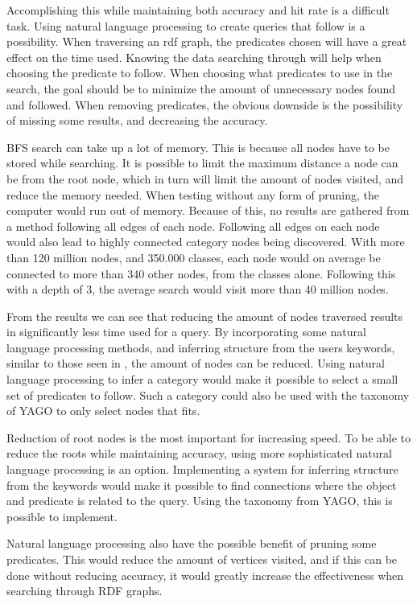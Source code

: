 Accomplishing this while maintaining both accuracy and hit rate is a difficult task. 
Using natural language processing to create queries that follow is a possibility.
When traversing an rdf graph, the predicates chosen will have a great effect on the time used. 
Knowing the data searching through will help when choosing the predicate to follow. 
When choosing what predicates to use in the search, the goal should be to minimize the amount of unnecessary nodes found and followed. 
When removing predicates, the obvious downside is the possibility of missing some results, and decreasing the accuracy.

BFS search can take up a lot of memory. This is because all nodes have to be stored while searching. It is possible to limit the maximum distance a node can be from the root node, which in turn will limit the amount of nodes visited, and reduce the memory needed. When testing without any form of pruning, the computer would run out of memory. Because of this, no results are gathered from a method following all edges of each node. Following all edges on each node would also lead to highly connected category nodes being discovered. With more than 120 million nodes, and 350.000 classes, each node would on average be connected to more than 340 other nodes, from the classes alone. Following this with a depth of 3, the average search would visit more than 40 million nodes.

From the results we can see that reducing the amount of nodes traversed results in significantly less time used for a query. By incorporating some natural language processing methods, and inferring structure from the users keywords, similar to those seen in \cite{4812421, aqualog}, the amount of nodes can be reduced. Using natural language processing to infer a category would make it possible to select a small set of predicates to follow. Such a category could also be used with the taxonomy of YAGO to only select nodes that fits.

Reduction of root nodes is the most important for increasing speed. To be able to reduce the roots while maintaining accuracy, using more sophisticated natural language processing is an option. Implementing a system for inferring structure from the keywords would make it possible to find connections where the object and predicate is related to the query. Using the taxonomy from YAGO, this is possible to implement.

Natural language processing also have the possible benefit of pruning some predicates. This would reduce the amount of vertices visited, and if this can be done without reducing accuracy, it would greatly increase the effectiveness when searching through RDF graphs.


